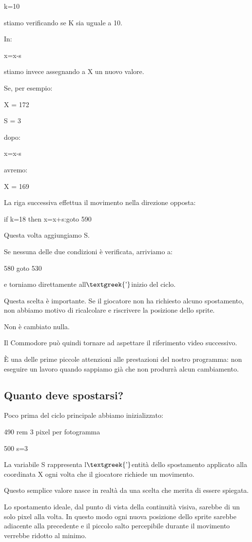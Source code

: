\documentclass{article}
\begin{document}
k=10

stiamo verificando se K sia uguale a 10.

In:

x=x-s

stiamo invece assegnando a X un nuovo valore.

Se, per esempio:

X = 172

S = 3

dopo:

x=x-s

avremo:

X = 169

La riga successiva effettua il movimento nella direzione opposta:

if k=18 then x=x+s:goto 590

Questa volta aggiungiamo S.

Se nessuna delle due condizioni è verificata, arriviamo a:

580 goto 530

e torniamo direttamente all$\text{\textgreek{’}}$inizio del ciclo.

Questa scelta è importante. Se il giocatore non ha richiesto alcuno spostamento, non abbiamo motivo di ricalcolare e
riscrivere la posizione dello sprite.

Non è cambiato nulla.

Il Commodore può quindi tornare ad aspettare il riferimento video successivo.

È una delle prime piccole attenzioni alle prestazioni del nostro programma: non eseguire un lavoro quando sappiamo già
che non produrrà alcun cambiamento.

\subsection{Quanto deve spostarsi?}
Poco prima del ciclo principale abbiamo inizializzato:

490 rem 3 pixel per fotogramma

500 s=3

La variabile S rappresenta l$\text{\textgreek{’}}$entità dello spostamento applicato alla coordinata X ogni volta che il
giocatore richiede un movimento.

Questo semplice valore nasce in realtà da una scelta che merita di essere spiegata.

Lo spostamento ideale, dal punto di vista della continuità visiva, sarebbe di un solo pixel alla volta. In questo modo
ogni nuova posizione dello sprite sarebbe adiacente alla precedente e il piccolo salto percepibile durante il movimento
verrebbe ridotto al minimo.
\end{document}
